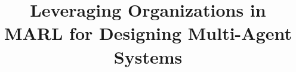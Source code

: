\documentclass[runningheads]{llncs}
\theoremstyle{freethm}
\theoremstyle{proofoutline}
\begin{document}
\title{Leveraging Organizations in MARL for Designing Multi-Agent Systems}
%
%

\author{}
\authorrunning{}
\institute{}


\maketitle              %

\end{document}
